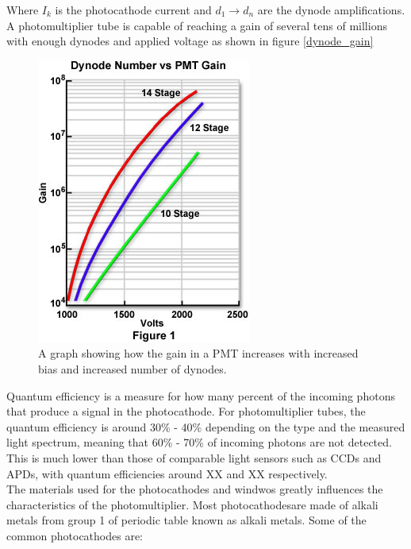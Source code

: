 Where $I_k$ is the photocathode current and $d_1 \rightarrow d_n$ are the dynode amplifications. A photomultiplier  tube is capable of reaching a gain of several tens of millions with enough dynodes and applied voltage as shown in figure \ref{dynode_gain}\\

\begin{figure}[htb]
\begin{center}
\includegraphics[scale=0.6]{figures/RCS/dynodegain}
\caption{A graph showing how the gain in a PMT increases with increased bias and increased number of dynodes.}
\label{fig:dynode_gain}
\end{center}
\end{figure}

Quantum efficiency is a measure for how many percent of the incoming photons that produce a signal in the photocathode. For photomultiplier tubes, the quantum efficiency is around 30\% - 40\% depending on the type and the measured light spectrum, meaning that 60\% - 70\% of incoming photons are not detected. This is much lower than those of comparable light sensors such as CCDs and APDs, with quantum efficiencies around XX and XX respectively.\\


The materials used for the photocathodes and windwos greatly influences the characteristics of the photomultiplier. Most photocathodesare made of alkali metals from group 1 of periodic table known as alkali metals. Some of the common photocathodes are:\\


